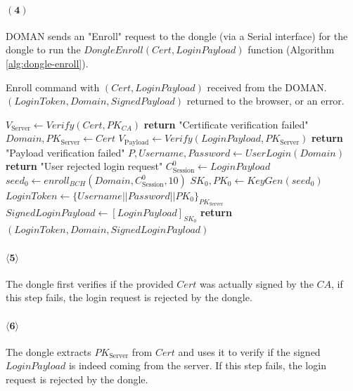 \paragraph{$\boldsymbol{(4)}$} DOMAN sends an "Enroll" request to the dongle (via a Serial interface) for the dongle to run the $DongleEnroll(Cert, LoginPayload)$ function (Algorithm \ref{alg:dongle-enroll}).

\begin{algorithm}[ht!]
\caption{$DongleEnroll(Cert, LoginPayload)$}
\begin{algorithmic}[1]
    \Require Enroll command with $(\mathit{Cert}, \mathit{LoginPayload})$ received from the DOMAN.
    \Ensure  $(\mathit{LoginToken}, Domain, \mathit{SignedPayload})$ returned to the browser,
             or an error.

    \State $V_{\text{Server}} \leftarrow Verify(Cert, PK_{CA})$
        \State \textbf{return} "Certificate verification failed"
    \EndIf
    \State $Domain, PK_{\text{Server}} \leftarrow Cert$
    \State $V_{\text{Payload}} \leftarrow Verify(LoginPayload, PK_{\text{Server}})$
        \State \textbf{return} "Payload verification failed"
    \EndIf
    \State $P, Username, Password \leftarrow UserLogin(Domain)$
        \State \textbf{return} "User rejected login request"
    \EndIf
    \State $C^0_{\text{Session}} \leftarrow LoginPayload$
    \State $seed_0 \leftarrow enroll_{BCH}(Domain, C^0_{\text{Session}}, 10)$
    \State $SK_0, PK_0 \leftarrow KeyGen(seed_0)$
    \State $LoginToken \leftarrow \{Username||Password||PK_0\}_{PK_{\text{Server}}}$
    \State $SignedLoginPayload \leftarrow [LoginPayload]_{SK_0}$
    \State \textbf{return} $(LoginToken, Domain, SignedLoginPayload)$
\end{algorithmic}
\label{alg:dongle-enroll}
\end{algorithm}
\paragraph{$\boldsymbol{\langle 5\rangle}$} The dongle first verifies if the provided $Cert$ was actually signed by the $CA$, if this step fails, the login request is rejected by the dongle.
\paragraph{$\boldsymbol{\langle 6\rangle}$} The dongle extracts $PK_\text{Server}$ from $Cert$ and uses it to verify if the signed $LoginPayload$ is indeed coming from the server. If this step fails, the login request is rejected by the dongle.
